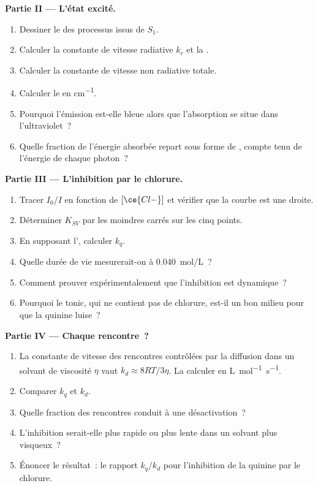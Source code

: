 \begin{problem}
\medskip\noindent\textbf{Partie II --- L'état excité.}
\begin{enumerate}[resume]
  \item Dessiner le  des processus issus de $S_1$.
  \item Calculer la constante de vitesse radiative $k_r$ et la .
  \item Calculer la constante de vitesse non radiative totale.
  \item Calculer le  en \unit{cm^{-1}}.
  \item Pourquoi l'émission est-elle bleue alors que l'absorption se
        situe dans l'ultraviolet~?
  \item Quelle fraction de l'énergie absorbée repart sous forme de
        , compte tenu de l'énergie de chaque photon~?
\end{enumerate}

\medskip\noindent\textbf{Partie III --- L'inhibition par le chlorure.}
\begin{enumerate}[resume]
  \item Tracer $I_0/I$ en fonction de $[\ce{Cl-}]$ et vérifier que la
        courbe est une droite.
  \item Déterminer $K_{SV}$ par les moindres carrés sur les cinq points.
  \item En supposant l', calculer $k_q$.
  \item Quelle durée de vie mesurerait-on à \qty{0.040}{mol/L}~?
  \item Comment prouver expérimentalement que l'inhibition est
        dynamique~?
  \item Pourquoi le tonic, qui ne contient pas de chlorure, est-il un bon
        milieu pour que la quinine luise~?
\end{enumerate}

\medskip\noindent\textbf{Partie IV --- Chaque rencontre~?}
\begin{enumerate}[resume]
  \item La constante de vitesse des rencontres contrôlées par la diffusion
        dans un solvant de viscosité $\eta$ vaut $k_d \approx 8RT/3\eta$.
        La calculer en \unit{L.mol^{-1}.s^{-1}}.
  \item Comparer $k_q$ et $k_d$.
  \item Quelle fraction des rencontres conduit à une désactivation~?
  \item L'inhibition serait-elle plus rapide ou plus lente dans un
        solvant plus visqueux~?
  \item Énoncer le résultat~: le rapport $k_q/k_d$ pour l'inhibition de
        la quinine par le chlorure.
\end{enumerate}
\end{problem}
